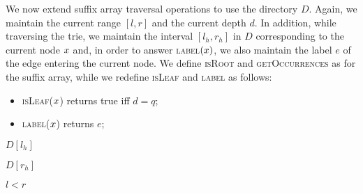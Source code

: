 We now extend suffix array traversal operations to use the directory $D$.
Again, we maintain the current range $[l,r]$ and the current depth $d$.
In addition, while traversing the trie, we maintain the interval $[l_h,r_h]$ in $D$ corresponding to the current node $x$ and, in order to answer \textsc{label}$(x)$, we also maintain the label $e$ of the edge entering the current node.
We define \textsc{isRoot} and \textsc{getOccurrences} as for the suffix array, while we redefine \textsc{isLeaf} and \textsc{label} as follows:
\begin{itemize}
\item \textsc{isLeaf}($x$) returns true iff $d=q$;
\item \textsc{label}($x$) returns $e$;
\end{itemize}

\begin{algorithm}[h!]
\begin{minipage}[t]{.5\textwidth}
\label{alg:qgram-lower}
\begin{algorithmic}[1]
	\State \Return $D[l_h]$
\EndProcedure
\end{algorithmic}
\end{minipage}
\hfill
\begin{minipage}[t]{.5\textwidth}
\label{alg:qgram-upper}
\begin{algorithmic}[1]
	\State \Return $D[r_h]$
\EndProcedure
\end{algorithmic}
\end{minipage}
\end{algorithm}

\begin{algorithm}[h!]
\begin{minipage}[t]{.5\textwidth}
\label{alg:qgram-goroot}
\begin{algorithmic}[1]
\EndProcedure
\end{algorithmic}
\end{minipage}
\begin{minipage}[t]{.5\textwidth}
\label{alg:qgram-godownc}
\begin{algorithmic}[1]
		\State \Return \False
	\EndIf
	\State \Return $l < r$
\EndProcedure
\end{algorithmic}
\end{minipage}
\end{algorithm}

